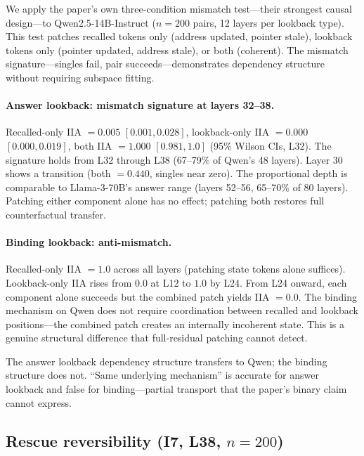\documentclass{article}
\begin{document}
We apply the paper's own three-condition mismatch test---their strongest causal design---to Qwen2.5-14B-Instruct ($n = 200$ pairs, 12 layers per lookback type). This test patches recalled tokens only (address updated, pointer stale), lookback tokens only (pointer updated, address stale), or both (coherent). The mismatch signature---singles fail, pair succeeds---demonstrates dependency structure without requiring subspace fitting.

\paragraph{Answer lookback: mismatch signature at layers 32--38.}
Recalled-only IIA $= 0.005$ $[0.001, 0.028]$, lookback-only IIA $= 0.000$ $[0.000, 0.019]$, both IIA $= 1.000$ $[0.981, 1.0]$ (95\% Wilson CIs, L32). The signature holds from L32 through L38 (67--79\% of Qwen's 48 layers). Layer 30 shows a transition (both $= 0.440$, singles near zero). The proportional depth is comparable to Llama-3-70B's answer range (layers 52--56, 65--70\% of 80 layers). Patching either component alone has no effect; patching both restores full counterfactual transfer.

\paragraph{Binding lookback: anti-mismatch.}
Recalled-only IIA $= 1.0$ across all layers (patching state tokens alone suffices). Lookback-only IIA rises from $0.0$ at L12 to $1.0$ by L24. From L24 onward, each component alone succeeds but the combined patch yields IIA $= 0.0$. The binding mechanism on Qwen does not require coordination between recalled and lookback positions---the combined patch creates an internally incoherent state. This is a genuine structural difference that full-residual patching cannot detect.

The answer lookback dependency structure transfers to Qwen; the binding structure does not. ``Same underlying mechanism'' is accurate for answer lookback and false for binding---partial transport that the paper's binary claim cannot express.

\subsection{Rescue reversibility (I7, L38, $n = 200$)}
\end{document}
